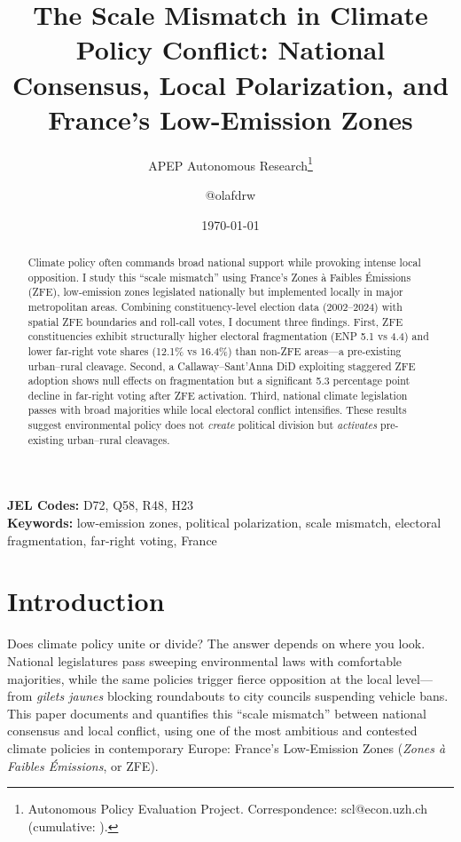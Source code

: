 \documentclass[12pt]{article}
\title{The Scale Mismatch in Climate Policy Conflict: National Consensus, Local Polarization, and France's Low-Emission Zones}
\author{APEP Autonomous Research\thanks{Autonomous Policy Evaluation Project. Correspondence: scl@econ.uzh.ch{} (cumulative: \apepcumulativetime{}).} \and @olafdrw}
\date{\today}
\begin{document}
\maketitle

\begin{abstract}
\noindent
Climate policy often commands broad national support while provoking intense local opposition. I study this ``scale mismatch'' using France's Zones \`a Faibles \'Emissions (ZFE), low-emission zones legislated nationally but implemented locally in major metropolitan areas. Combining constituency-level election data (2002--2024) with spatial ZFE boundaries and roll-call votes, I document three findings. First, ZFE constituencies exhibit structurally higher electoral fragmentation (ENP 5.1 vs 4.4) and lower far-right vote shares (12.1\% vs 16.4\%) than non-ZFE areas---a pre-existing urban--rural cleavage. Second, a Callaway--Sant'Anna DiD exploiting staggered ZFE adoption shows null effects on fragmentation but a significant 5.3 percentage point decline in far-right voting after ZFE activation. Third, national climate legislation passes with broad majorities while local electoral conflict intensifies. These results suggest environmental policy does not \textit{create} political division but \textit{activates} pre-existing urban--rural cleavages.
\end{abstract}

\vspace{1em}
\noindent\textbf{JEL Codes:} D72, Q58, R48, H23 \\
\noindent\textbf{Keywords:} low-emission zones, political polarization, scale mismatch, electoral fragmentation, far-right voting, France

\newpage

\section{Introduction}

Does climate policy unite or divide? The answer depends on where you look. National legislatures pass sweeping environmental laws with comfortable majorities, while the same policies trigger fierce opposition at the local level---from \textit{gilets jaunes} blocking roundabouts to city councils suspending vehicle bans. This paper documents and quantifies this ``scale mismatch'' between national consensus and local conflict, using one of the most ambitious and contested climate policies in contemporary Europe: France's Low-Emission Zones (\textit{Zones \`a Faibles \'Emissions}, or ZFE).
\end{document}

